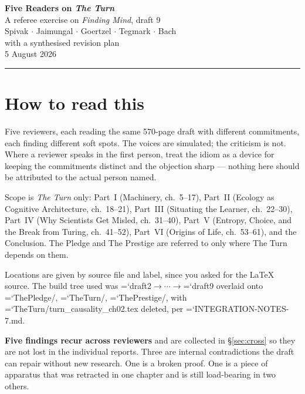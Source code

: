 \documentclass[11pt,letterpaper]{article}
\newcommand{\loc}[1]{{\small\ttfamily\color{accent}\hyphenchar\font=`\-\relax #1}}
\newcommand{\fnd}[1]{\textbf{\color{warn}#1}}
\begin{document}
\begin{center}
{\LARGE\bfseries\color{accent} Five Readers on \emph{The Turn}}\\[0.5em]
{\large A referee exercise on \emph{Finding Mind}, draft 9}\\[1.2em]
{\small Spivak $\cdot$ Jaimungal $\cdot$ Goertzel $\cdot$ Tegmark $\cdot$ Bach}\\[0.4em]
{\small\color{rule} with a synthesised revision plan}\\[0.8em]
{\footnotesize\color{rule} 5 August 2026}
\end{center}

\vspace{1.2em}
\hrule
\vspace{1.2em}

\section*{How to read this}

Five reviewers, each reading the same 570-page draft with different
commitments, each finding different soft spots. The voices are
simulated; the criticism is not. Where a reviewer speaks in the first
person, treat the idiom as a device for keeping the commitments
distinct and the objection sharp --- nothing here should be attributed
to the actual person named.

Scope is \emph{The Turn} only: Part~I (Machinery, ch.~5--17),
Part~II (Ecology as Cognitive Architecture, ch.~18--21), Part~III
(Situating the Learner, ch.~22--30), Part~IV (Why Scientists Get
Misled, ch.~31--40), Part~V (Entropy, Choice, and the Break from
Turing, ch.~41--52), Part~VI (Origins of Life, ch.~53--61), and the
Conclusion. The Pledge and The Prestige are referred to only where The
Turn depends on them.

Locations are given by source file and label, since you asked for the
\LaTeX{} source. The build tree used was
\loc{draft2}$\to\cdots\to$\loc{draft9} overlaid onto
\loc{ThePledge/}, \loc{TheTurn/}, \loc{ThePrestige/}, with
\loc{TheTurn/turn\_causality\_ch02.tex} deleted, per
\loc{INTEGRATION-NOTES-7.md}.

\vspace{0.6em}
\begin{flag}
\fnd{Five findings recur across reviewers} and are collected in
\S\ref{sec:cross} so they are not lost in the individual reports.
Three are internal contradictions the draft can repair without new
research. One is a broken proof. One is a piece of apparatus that was
retracted in one chapter and is still load-bearing in two others.
\end{flag}
\end{document}
